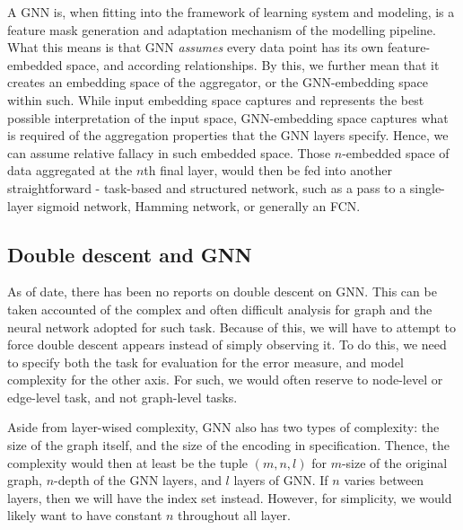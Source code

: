 \documentclass[10pt,oneside,oldfontcommands,dvipsnames,article]{memoir}
\begin{document}
A GNN is, when fitting into the framework of learning system and modeling, is a feature mask generation and adaptation mechanism of the modelling pipeline. What this means is that GNN \textit{assumes} every data point has its own feature-embedded space, and according relationships. By this, we further mean that it creates an embedding space of the aggregator, or the GNN-embedding space within such. While input embedding space captures and represents the best possible interpretation of the input space, GNN-embedding space captures what is required of the aggregation properties that the GNN layers specify. Hence, we can assume relative fallacy in such embedded space. Those $n$-embedded space of data aggregated at the $n$th final layer, would then be fed into another straightforward - task-based and structured network, such as a pass to a single-layer sigmoid network, Hamming network, or generally an FCN. 

\subsection{Double descent and GNN}

As of date, there has been no reports on double descent on GNN. This can be taken accounted of the complex and often difficult analysis for graph and the neural network adopted for such task. Because of this, we will have to attempt to force double descent appears instead of simply observing it. To do this, we need to specify both the task for evaluation for the error measure, and model complexity for the other axis. For such, we would often reserve to node-level or edge-level task, and not graph-level tasks. 

Aside from layer-wised complexity, GNN also has two types of complexity: the size of the graph itself, and the size of the encoding in specification. Thence, the complexity would then at least be the tuple $(m,n,l)$ for $m$-size of the original graph, $n$-depth of the GNN layers, and $l$ layers of GNN. If $n$ varies between layers, then we will have the index set instead. However, for simplicity, we would likely want to have constant $n$ throughout all layer. 

\clearpage
\end{document}
